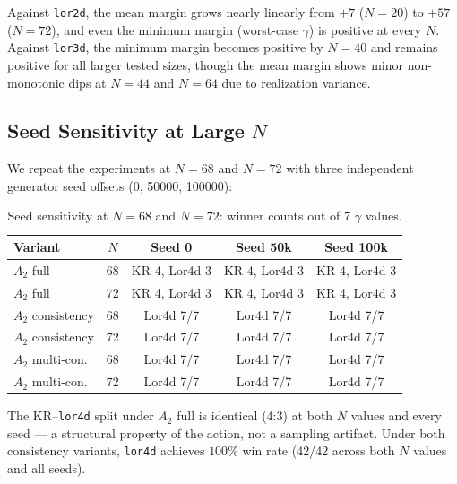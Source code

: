 \documentclass[entropy,article,submit,pdftex,moreauthors]{Definitions/mdpi}
\begin{document}
Against \texttt{lor2d}, the mean margin grows nearly linearly from $+7$ ($N = 20$) to $+57$ ($N = 72$), and even the minimum margin (worst-case $\gamma$) is positive at every $N$. Against \texttt{lor3d}, the minimum margin becomes positive by $N = 40$ and remains positive for all larger tested sizes, though the mean margin shows minor non-monotonic dips at $N = 44$ and $N = 64$ due to realization variance.

\subsection{Seed Sensitivity at Large $N$}

We repeat the experiments at $N = 68$ and $N = 72$ with three independent generator seed offsets (0, 50000, 100000):

\begin{table}[H]
\caption{Seed sensitivity at $N = 68$ and $N = 72$: winner counts out of 7 $\gamma$ values.\label{tab:seed}}
\begin{tabular}{lcccc}
\toprule
\textbf{Variant} & \boldmath$N$ & \textbf{Seed 0} & \textbf{Seed 50k} & \textbf{Seed 100k} \\
\midrule
$A_2$ full & 68 & KR 4, Lor4d 3 & KR 4, Lor4d 3 & KR 4, Lor4d 3 \\
$A_2$ full & 72 & KR 4, Lor4d 3 & KR 4, Lor4d 3 & KR 4, Lor4d 3 \\
$A_2$ consistency & 68 & Lor4d 7/7 & Lor4d 7/7 & Lor4d 7/7 \\
$A_2$ consistency & 72 & Lor4d 7/7 & Lor4d 7/7 & Lor4d 7/7 \\
$A_2$ multi-con. & 68 & Lor4d 7/7 & Lor4d 7/7 & Lor4d 7/7 \\
$A_2$ multi-con. & 72 & Lor4d 7/7 & Lor4d 7/7 & Lor4d 7/7 \\
\bottomrule
\end{tabular}
\end{table}

The KR--\texttt{lor4d} split under $A_2$ full is identical (4:3) at both $N$ values and every seed --- a structural property of the action, not a sampling artifact. Under both consistency variants, \texttt{lor4d} achieves $100\%$ win rate (42/42 across both $N$ values and all seeds).
\end{document}
